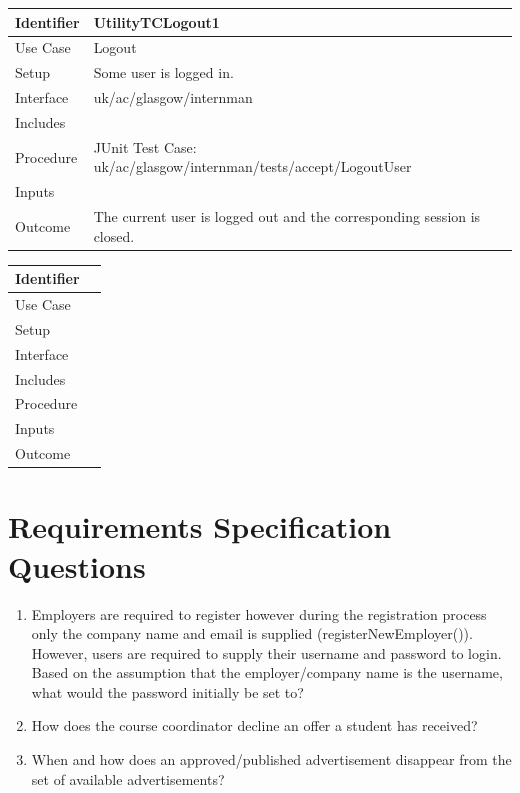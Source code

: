\documentclass[11pt]{article}
\begin{document}
\vspace{2em}

\begin{tabularx}{\textwidth}{|T|L|}
\hline
Identifier & UtilityTCLogout1\\
\hline
Use Case & Logout\\
\hline
Setup & Some user is logged in.\\
\hline
Interface & uk/ac/glasgow/internman\\
\hline
Includes &\\
\hline
Procedure & JUnit Test Case: uk/ac/glasgow/internman/tests/accept/LogoutUser\\
\hline
Inputs &\\
\hline
Outcome & The current user is logged out and the corresponding session is
closed.\\
\hline
\end{tabularx}

\vspace{2em}

\begin{tabularx}{\textwidth}{|T|L|}
\hline
Identifier &\\
\hline
Use Case &\\
\hline
Setup &\\
\hline
Interface &\\
\hline
Includes &\\
\hline
Procedure &\\
\hline
Inputs &\\
\hline
Outcome &\\
\hline
\end{tabularx}

\newpage

\section{Requirements Specification Questions}

\begin{enumerate}

\item{Employers are required to register however during the registration process
only the company name and email is supplied (registerNewEmployer()). However,
users are required to supply their username and password to login. Based on the
assumption that the employer/company name is the username, what would the
password initially be set to?}

\item{How does the course coordinator decline an offer a student has received?}

\item{\label{itm:advertDestroy} When and how does an approved/published 
advertisement disappear from the set of available advertisements?}

\end{enumerate}
\end{document}
